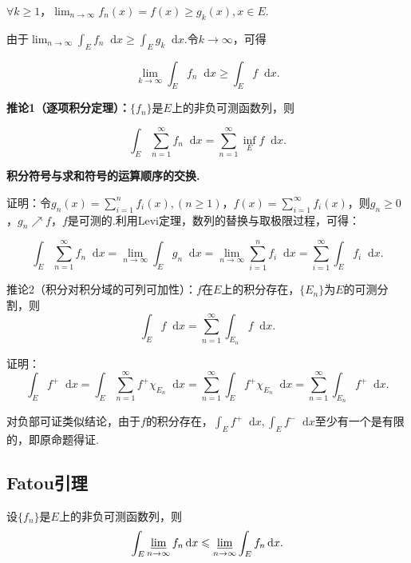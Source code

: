 \documentclass[bwprint, withoutpreface]{cumcmthesis}
\newcommand*{\dif}{\mathop{}\!\mathrm{d}}
\begin{document}
$\forall k \geqslant 1$，$\lim_{n \to \infty}{f_n(x)} = f(x) \geqslant g_k(x), x \in E$.

由于$\lim_{n \to \infty}{\int_E f_n \dif x \geqslant \int_E g_k \dif x}$.令$k \to \infty$，可得

\begin{equation*}
	\lim_{k \to \infty}{\int_E f_n \dif x} \geqslant \int_E f \dif x.
\end{equation*}

\textbf{推论1（逐项积分定理）：}$\{f_n\}$是$E$上的非负可测函数列，则

\begin{equation*}
	\int_E \sum_{n = 1}^{\infty}{f_n} \dif x = \sum_{n = 1}^{\infty}{\inf_E f \dif x}.
\end{equation*}

\textbf{积分符号与求和符号的运算顺序的交换.}

证明：令$g_n(x) = \sum_{i = 1}^{n}{f_i(x)},(n \geqslant 1)$，$f(x) = \sum_{i = 1}^{\infty}{f_i(x)}$，则$g_n \geqslant 0$，$g_n \nearrow f$，$f$是可测的.利用Levi定理，数列的替换与取极限过程，可得：

\begin{equation*}
	\int_E \sum_{n = 1}^{\infty}{f_n \dif x} = \lim_{n \to \infty}{\int_E g_n \dif x} = \lim_{n \to \infty}{\sum_{i = 1}^{n}{f_i} \dif x} = \sum_{i = 1}^{\infty}\int_E f_i \dif x.	
\end{equation*}

推论2（积分对积分域的可列可加性）：$f$在$E$上的积分存在，$\{E_n\}$为$E$的可测分割，则\[ \int_E f \dif x = \sum_{n = 1}^{\infty}{\int_{E_n} f \dif x}. \]

证明：
\begin{equation*}
	\int_E f^+ \dif x = \int_E \sum_{n = 1}^{\infty}{f^+ \chi_{E_n} \dif x} = \sum_{n = 1}^{\infty}{\int_E f^+ \chi_{E_n} \dif x} = \sum_{n = 1}^{\infty}{\int_{E_n} f^+ \dif x}.
\end{equation*}

对负部可证类似结论，由于$f$的积分存在，$\int_E f^+ \dif x, \int_E f^- \dif x $至少有一个是有限的，即原命题得证.

\subsection{Fatou引理}
设$\{f_n\}$是$E$上的非负可测函数列，则
\begin{equation*}
	\int_E \varliminf_{n \to \infty} f_n \dif x \leqslant \varliminf_{n \to \infty} \int_E f_n \dif x. 
\end{equation*}
\end{document}
